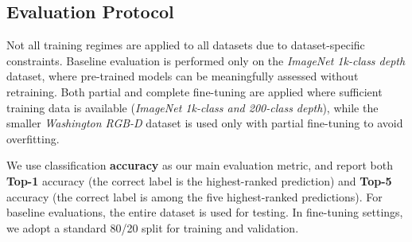 \subsection{Evaluation Protocol}

Not all training regimes are applied to all datasets due to dataset-specific constraints. Baseline evaluation is performed only on the \textit{ImageNet 1k-class depth} dataset, where pre-trained models can be meaningfully assessed without retraining. Both partial and complete fine-tuning are applied where sufficient training data is available (\textit{ImageNet 1k-class and 200-class depth}), while the smaller \textit{Washington RGB-D} dataset is used only with partial fine-tuning to avoid overfitting.

We use classification \textbf{accuracy} as our main evaluation metric, and report both \textbf{Top-1} accuracy (the correct label is the highest-ranked prediction) and \textbf{Top-5} accuracy (the correct label is among the five highest-ranked predictions). For baseline evaluations, the entire dataset is used for testing. In fine-tuning settings, we adopt a standard 80/20 split for training and validation.